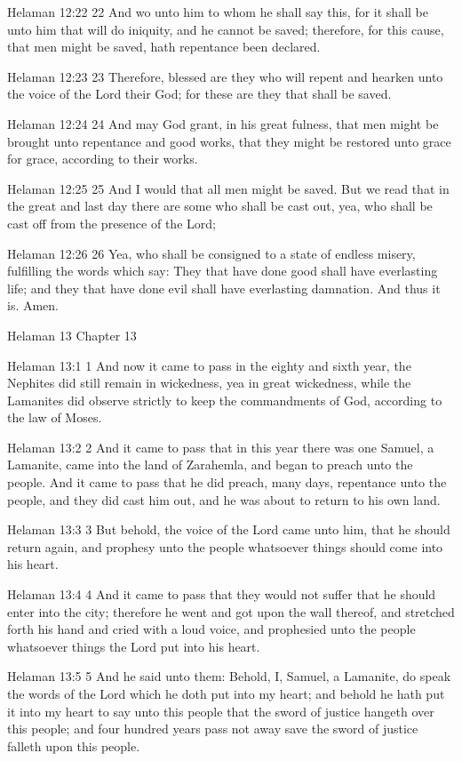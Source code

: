 Helaman 12:22
 22 And wo unto him to whom he shall say this, for it shall be
unto him that will do iniquity, and he cannot be saved;
therefore, for this cause, that men might be saved, hath
repentance been declared.

Helaman 12:23
 23 Therefore, blessed are they who will repent and hearken unto
the voice of the Lord their God; for these are they that shall be
saved.

Helaman 12:24
 24 And may God grant, in his great fulness, that men might be
brought unto repentance and good works, that they might be
restored unto grace for grace, according to their works.

Helaman 12:25
 25 And I would that all men might be saved. But we read that in
the great and last day there are some who shall be cast out, yea,
who shall be cast off from the presence of the Lord;

Helaman 12:26
 26 Yea, who shall be consigned to a state of endless misery,
fulfilling the words which say: They that have done good shall
have everlasting life; and they that have done evil shall have
everlasting damnation. And thus it is. Amen.

Helaman 13
Chapter 13

Helaman 13:1
 1 And now it came to pass in the eighty and sixth year, the
Nephites did still remain in wickedness, yea in great wickedness,
while the Lamanites did observe strictly to keep the commandments
of God, according to the law of Moses.

Helaman 13:2
 2 And it came to pass that in this year there was one Samuel, a
Lamanite, came into the land of Zarahemla, and began to preach
unto the people. And it came to pass that he did preach, many
days, repentance unto the people, and they did cast him out, and
he was about to return to his own land.

Helaman 13:3
 3 But behold, the voice of the Lord came unto him, that he
should return again, and prophesy unto the people whatsoever
things should come into his heart.

Helaman 13:4
 4 And it came to pass that they would not suffer that he should
enter into the city; therefore he went and got upon the wall
thereof, and stretched forth his hand and cried with a loud
voice, and prophesied unto the people whatsoever things the Lord
put into his heart.

Helaman 13:5
 5 And he said unto them: Behold, I, Samuel, a Lamanite, do speak
the words of the Lord which he doth put into my heart; and behold
he hath put it into my heart to say unto this people that the
sword of justice hangeth over this people; and four hundred years
pass not away save the sword of justice falleth upon this people.

